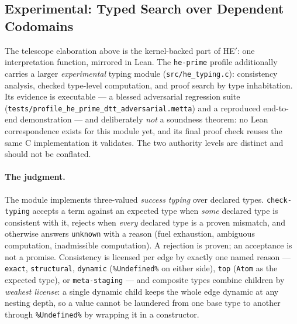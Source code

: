 \documentclass[11pt]{article}
\newcommand{\code}[1]{\texttt{#1}}
\begin{document}
\subsection{Experimental: Typed Search over Dependent Codomains}
\label{sec:heprime-typed-search}

The telescope elaboration above is the kernel-backed part of HE$'$:
one interpretation function, mirrored in Lean.  The \code{he-prime}
profile additionally carries a larger \emph{experimental} typing module
(\code{src/he\_typing.c}): consistency analysis, checked type-level
computation, and proof search by type inhabitation.  Its evidence is
executable --- a blessed adversarial regression suite
(\code{tests/profile\_he\_prime\_dtt\_adversarial.metta}) and a
reproduced end-to-end demonstration --- and deliberately \emph{not} a
soundness theorem: no Lean correspondence exists for this module yet,
and its final proof check reuses the same C implementation it
validates.  The two authority levels are distinct and should not be
conflated.

\paragraph{The judgment.}  The module implements three-valued
\emph{success typing} over declared types.  \code{check-typing}
accepts a term against an expected type when \emph{some} declared type
is consistent with it, rejects when \emph{every} declared type is a
proven mismatch, and otherwise answers \code{unknown} with a reason
(fuel exhaustion, ambiguous computation, inadmissible computation).  A
rejection is proven; an acceptance is not a promise.  Consistency is
licensed per edge by exactly one named reason --- \code{exact},
\code{structural}, \code{dynamic} (\code{\%Undefined\%} on either
side), \code{top} (\code{Atom} as the expected type), or
\code{meta-staging} --- and composite types combine children by
\emph{weakest license}: a single dynamic child keeps the whole edge
dynamic at any nesting depth, so a value cannot be laundered from one
base type to another through \code{\%Undefined\%} by wrapping it in a
constructor.
\end{document}
